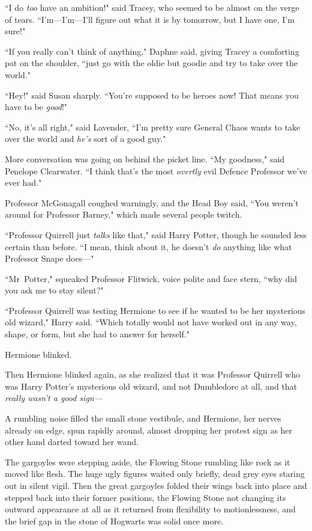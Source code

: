 ``I do \emph{too} have an ambition!" said Tracey, who seemed to be almost on the verge of tears. ``I'm—I'm—I'll figure out what it is by tomorrow, but I have one, I'm sure!"

``If you really can't think of anything," Daphne said, giving Tracey a comforting pat on the shoulder, ``just go with the oldie but goodie and try to take over the world."

``Hey!" said Susan sharply. ``You're supposed to be heroes now! That means you have to be \emph{good}!"

``No, it's all right," said Lavender, ``I'm pretty sure General Chaos wants to take over the world and \emph{he's} sort of a good guy."

More conversation was going on behind the picket line. ``My goodness," said Penelope Clearwater. ``I think that's the most \emph{overtly} evil Defence Professor we've ever had."

Professor McGonagall coughed warningly, and the Head Boy said, ``You weren't around for Professor Barney," which made several people twitch.

``Professor Quirrell just \emph{talks} like that," said Harry Potter, though he sounded less certain than before. ``I mean, think about it, he doesn't \emph{do} anything like what Professor Snape does—"

``Mr~Potter," squeaked Professor Flitwick, voice polite and face stern, ``why did you ask me to stay silent?"

``Professor Quirrell was testing Hermione to see if he wanted to be her mysterious old wizard," Harry said. ``Which totally would not have worked out in any way, shape, or form, but she had to answer for herself."

Hermione blinked.

Then Hermione blinked again, as she realized that it was Professor Quirrell who was Harry Potter's mysterious old wizard, and not Dumbledore at all, and that \emph{really wasn't a good sign—}

A rumbling noise filled the small stone vestibule, and Hermione, her nerves already on edge, spun rapidly around, almost dropping her protest sign as her other hand darted toward her wand.

The gargoyles were stepping aside, the Flowing Stone rumbling like rock as it moved like flesh. The huge ugly figures waited only briefly, dead grey eyes staring out in silent vigil. Then the great gargoyles folded their wings back into place and stepped back into their former positions, the Flowing Stone not changing its outward appearance at all as it returned from flexibility to motionlessness, and the brief gap in the stone of Hogwarts was solid once more.

